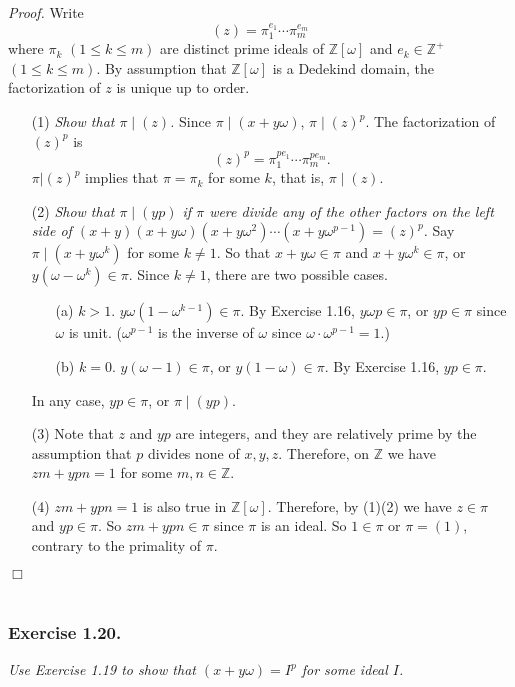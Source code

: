 \documentclass{article}
\begin{document}
\emph{Proof.}
Write $$(z) = {\pi}_1^{e_1} \cdots {\pi}_m^{e_m}$$ where
$\pi_k$ $(1 \leq k \leq m)$ are distinct prime ideals of $\mathbb{Z}[\omega]$ and
$e_k \in \mathbb{Z}^+$ $(1 \leq k \leq m)$.
By assumption that $\mathbb{Z}[\omega]$ is a Dedekind domain,
the factorization of $z$ is unique up to order.
\begin{enumerate}
\item[(1)]
\emph{Show that $\pi \mid (z)$.}
Since $\pi \mid (x + y\omega)$, $\pi \mid (z)^p$.
The factorization of $(z)^p$ is
$$(z)^p = {\pi}_1^{pe_1} \cdots {\pi}_m^{pe_m}.$$
$\pi | (z)^p$ implies that $\pi = \pi_k$ for some $k$,
that is, $\pi \mid (z)$.
\item[(2)]
\emph{Show that $\pi \mid (yp)$ if $\pi$ were divide any of
the other factors on the left side of
$(x+y)(x+y\omega)(x+y\omega^2) \cdots (x+y\omega^{p-1}) = (z)^p$.}
Say $\pi \mid (x+y\omega^k)$ for some $k \neq 1$.
So that $x+y\omega \in \pi$ and $x+y\omega^k \in \pi$,
or $y(\omega - \omega^k) \in \pi$.
Since $k \neq 1$, there are two possible cases.
  \begin{enumerate}
  \item[(a)]
  $k > 1$. $y\omega(1 - \omega^{k-1}) \in \pi$.
  By Exercise 1.16, $y\omega p \in \pi$, or $yp \in \pi$ since $\omega$ is unit.
  ($\omega^{p-1}$ is the inverse of $\omega$ since $\omega \cdot \omega^{p-1} = 1$.)
  \item[(b)]
  $k = 0$. $y(\omega - 1) \in \pi$, or $y(1 - \omega) \in \pi$.
  By Exercise 1.16, $yp \in \pi$.
  \end{enumerate}
In any case, $yp \in \pi$, or $\pi \mid (yp)$.
\item[(3)]
Note that $z$ and $yp$ are integers, and they are relatively prime by the assumption
that $p$ divides none of $x, y, z$.
Therefore, on $\mathbb{Z}$ we have $zm + ypn = 1$ for some $m, n \in \mathbb{Z}$.
\item[(4)]
$zm + ypn = 1$ is also true in $\mathbb{Z}[\omega]$.
Therefore, by (1)(2) we have $z \in \pi$ and $yp \in \pi$.
So $zm + ypn \in \pi$ since $\pi$ is an ideal.
So $1 \in \pi$ or $\pi = (1)$, contrary to the primality of $\pi$.
\end{enumerate}
$\Box$ \\\\






\subsubsection*{Exercise 1.20.}
\emph{Use Exercise 1.19 to show that
$(x+y\omega) = I^p$ for some ideal $I$. } \\
\end{document}
